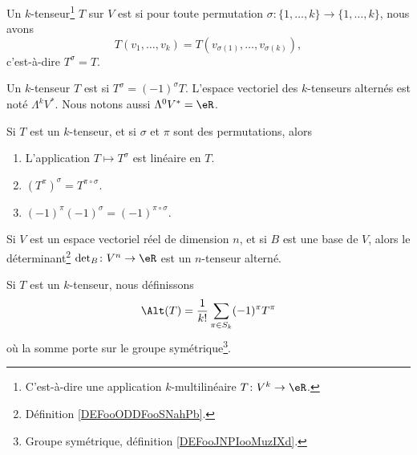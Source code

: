 \begin{definition}
	Un \( k\)-tenseur\footnote{C'est-à-dire une application \( k\)-multilinéaire \(T \colon V^k\to \eR  \).} \( T\) sur \( V\) est  si pour toute permutation \(\sigma \colon \{ 1,\ldots,k \}\to \{ 1,\ldots,k \}  \), nous avons
	\begin{equation}
		T(v_1,\ldots,v_k)=T(v_{\sigma(1)},\ldots,v_{\sigma(k)}),
	\end{equation}
	c'est-à-dire \( T^{\sigma}=T\).
\end{definition}

\begin{definition}
	Un \( k\)-tenseur \( T\) est  si \( T^{\sigma}=(-1)^{\sigma}T\). L'espace vectoriel des \( k\)-tenseurs alternés est noté \( \Lambda^kV^*\). Nous notons aussi \( \Lambda^0V^*=\eR\).
\end{definition}

\begin{lemma}		\label{LEMooJEZYooMmrtgu}
	Si \( T\) est un \( k\)-tenseur, et si \( \sigma\) et \( \pi\) sont des permutations, alors
	\begin{enumerate}
		\item
		      L'application \( T\mapsto T^{\sigma}\) est linéaire en \( T\).
		\item
		      \( (T^{\pi})^{\sigma}=T^{\pi\circ \sigma}\).
		\item
		      \( (-1)^{\pi}(-1)^{\sigma}=(-1)^{\pi\circ \sigma}\).
	\end{enumerate}
\end{lemma}


\begin{lemma}		\label{LEMooZMTPooKnqSuz}
	Si \( V\) est un espace vectoriel réel de dimension \( n\), et si \( B\) est une base de \( V\), alors le déterminant\footnote{Définition \ref{DEFooODDFooSNahPb}.} \(\det_B \colon V^n\to \eR  \) est un \( n\)-tenseur alterné.
\end{lemma}

\begin{definition}		\label{DEFooHAKAooIfbsEy}
	Si \( T\) est un \( k\)-tenseur, nous définissons
	\begin{equation}
		\Alt(T)=\frac{1}{ k!}\sum_{\pi\in S_k}(-1)^{\pi}T^{\pi}
	\end{equation}
	où la somme porte sur le groupe symétrique\footnote{Groupe symétrique, définition \ref{DEFooJNPIooMuzIXd}.}.
\end{definition}

